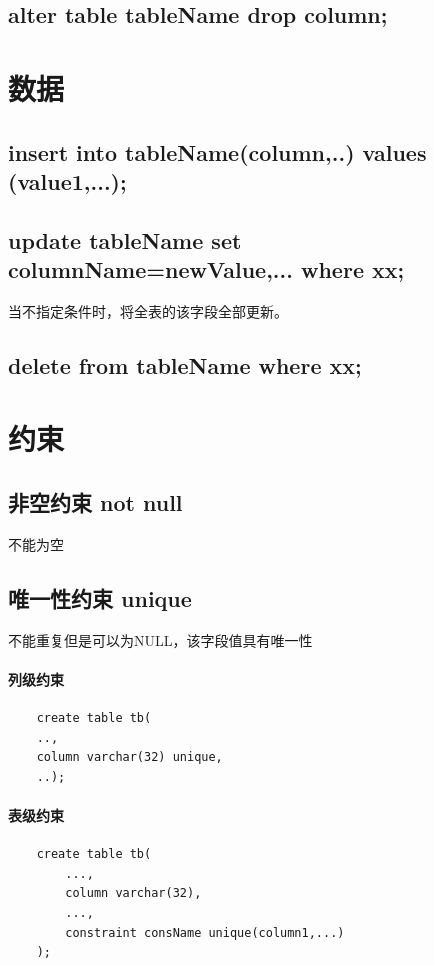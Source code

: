 \documentclass[UTF8,a4paper,12pt]{ctexbook}
\begin{document}
		\subsection{alter table tableName drop column;}
	
	
		
	\section{数据}
		\subsection{insert into tableName(column,..) values (value1,...);}
		
		\subsection{update tableName set columnName=newValue,... where xx;}
			当不指定条件时，将全表的该字段全部更新。
		
		\subsection{delete from tableName where xx;}
	
	
		
	\section{约束}
		\subsection{非空约束 not null}
			不能为空
			
		\subsection{唯一性约束 unique}
			不能重复但是可以为NULL，该字段值具有唯一性
			
			\paragraph{列级约束}
				\begin{lstlisting}
	create table tb(
	..,
	column varchar(32) unique,
	..);
				\end{lstlisting}
				
			\paragraph{表级约束}
				\begin{lstlisting}
	create table tb(
		...,
		column varchar(32),
		...,
		constraint consName unique(column1,...)
	);
				\end{lstlisting}
			
\end{document}
